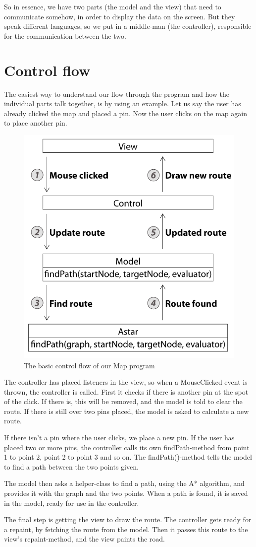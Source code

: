 So in essence, we have two parts (the model and the view) that need to communicate 
somehow, in order to display the data on the screen. But they speak different languages, so 
we put in a middle-man (the controller), responsible for the communication between the two.

\section{Control flow}
\label{UML-CF}
The easiest way to understand our flow through the program and how the individual parts 
talk together, is by using an example. Let us say the user has already clicked the map and 
placed a pin. Now the user clicks on the map again to place another pin.

\begin{figure}[h!]
\centering
\includegraphics[width=0.75\linewidth]{images/SimpleControlFlow}
\caption{The basic control flow of our Map program}
\label{control-flow}
\end{figure}

The controller has placed listeners in the view, so when a MouseClicked event is
thrown, the controller is called. First it checks if there is another pin at the spot of the click. If 
there is, this will be removed, and the model is told to clear the route. If there is still over two 
pins placed, the model is asked to calculate a new route.

If there isn't a pin where the user clicks, we place a new pin. If the user has placed two or 
more pins, the controller calls its own findPath-method from point 1 to point 2, point 2 to 
point 3 and so on. The findPath()-method tells the model to find a path between the two 
points given.

The model then asks a helper-class to find a path, using the A* algorithm, and provides it 
with the graph and the two points. When a path is found, it is saved in the model, ready 
for use in the controller.

The final step is getting the view to draw the route. The controller gets ready for a repaint, 
by fetching the route from the model. Then it passes this route to the view's repaint-method, 
and the view paints the road.